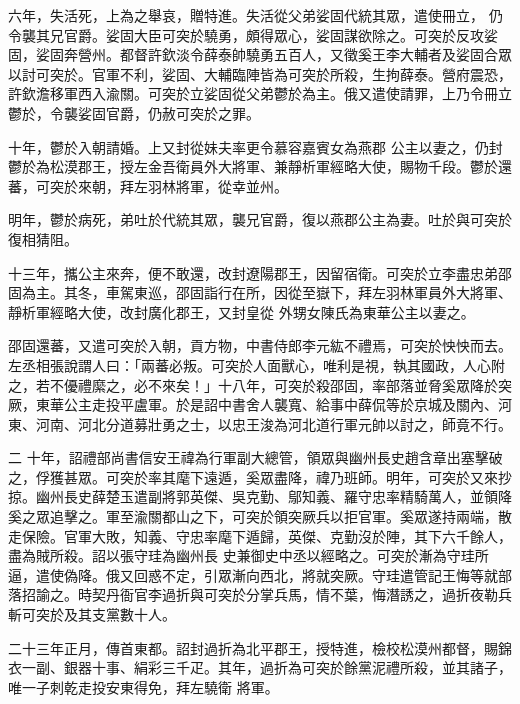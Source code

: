 \begin{pinyinscope}
 六年，失活死，上為之舉哀，贈特進。失活從父弟娑固代統其眾，遣使冊立，
 仍令襲其兄官爵。娑固大臣可突於驍勇，頗得眾心，娑固謀欲除之。可突於反攻娑固，娑固奔營州。都督許欽淡令薛泰帥驍勇五百人，又徵奚王李大輔者及娑固合眾以討可突於。官軍不利，娑固、大輔臨陣皆為可突於所殺，生拘薛泰。營府震恐，許欽澹移軍西入渝關。可突於立娑固從父弟鬱於為主。俄又遣使請罪，上乃令冊立鬱於，令襲娑固官爵，仍赦可突於之罪。



 十年，鬱於入朝請婚。上又封從妹夫率更令慕容嘉賓女為燕郡
 公主以妻之，仍封鬱於為松漠郡王，授左金吾衛員外大將軍、兼靜析軍經略大使，賜物千段。鬱於還蕃，可突於來朝，拜左羽林將軍，從幸並州。



 明年，鬱於病死，弟吐於代統其眾，襲兄官爵，復以燕郡公主為妻。吐於與可突於復相猜阻。



 十三年，攜公主來奔，便不敢還，改封遼陽郡王，因留宿衛。可突於立李盡忠弟邵固為主。其冬，車駕東巡，邵固詣行在所，因從至嶽下，拜左羽林軍員外大將軍、靜析軍經略大使，改封廣化郡王，又封皇從
 外甥女陳氏為東華公主以妻之。



 邵固還蕃，又遣可突於入朝，貢方物，中書侍郎李元紘不禮焉，可突於怏怏而去。左丞相張說謂人曰：「兩蕃必叛。可突於人面獸心，唯利是視，執其國政，人心附之，若不優禮縻之，必不來矣！」十八年，可突於殺邵固，率部落並脅奚眾降於突厥，東華公主走投平盧軍。於是詔中書舍人襲寬、給事中薛侃等於京城及關內、河東、河南、河北分道募壯勇之士，以忠王浚為河北道行軍元帥以討之，師竟不行。



 二
 十年，詔禮部尚書信安王禕為行軍副大總管，領眾與幽州長史趙含章出塞擊破之，俘獲甚眾。可突於率其麾下遠遁，奚眾盡降，禕乃班師。明年，可突於又來抄掠。幽州長史薛楚玉遣副將郭英傑、吳克勤、鄔知義、羅守忠率精騎萬人，並領降奚之眾追擊之。軍至渝關都山之下，可突於領突厥兵以拒官軍。奚眾遂持兩端，散走保險。官軍大敗，知義、守忠率麾下遁歸，英傑、克勤沒於陣，其下六千餘人，盡為賊所殺。詔以張守珪為幽州長
 史兼御史中丞以經略之。可突於漸為守珪所逼，遣使偽降。俄又回惑不定，引眾漸向西北，將就突厥。守珪遣管記王悔等就部落招諭之。時契丹衙官李過折與可突於分掌兵馬，情不葉，悔潛誘之，過折夜勒兵斬可突於及其支黨數十人。



 二十三年正月，傳首東都。詔封過折為北平郡王，授特進，檢校松漠州都督，賜錦衣一副、銀器十事、絹彩三千疋。其年，過折為可突於餘黨泥禮所殺，並其諸子，唯一子刺乾走投安東得免，拜左驍衛
 將軍。




\end{pinyinscope}
